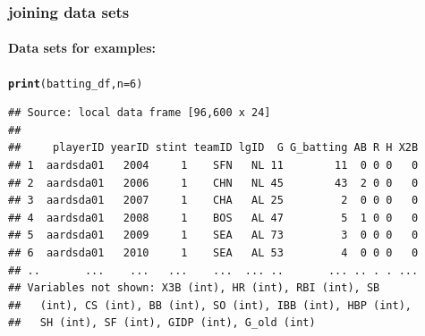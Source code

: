 \documentclass{beamer}\usepackage[]{graphicx}\usepackage[]{color}
\makeatletter
\newcommand{\hlnum}[1]{\textcolor[rgb]{0.686,0.059,0.569}{#1}}%
\newcommand{\hlstr}[1]{\textcolor[rgb]{0.192,0.494,0.8}{#1}}%
\newcommand{\hlcom}[1]{\textcolor[rgb]{0.678,0.584,0.686}{\textit{#1}}}%
\newcommand{\hlopt}[1]{\textcolor[rgb]{0,0,0}{#1}}%
\newcommand{\hlstd}[1]{\textcolor[rgb]{0.345,0.345,0.345}{#1}}%
\newcommand{\hlkwb}[1]{\textcolor[rgb]{0.69,0.353,0.396}{#1}}%
\newcommand{\hlkwc}[1]{\textcolor[rgb]{0.333,0.667,0.333}{#1}}%
\newcommand{\hlkwd}[1]{\textcolor[rgb]{0.737,0.353,0.396}{\textbf{#1}}}%
\newenvironment{kframe}{%
 \def\at@end@of@kframe{}%
 \ifinner\ifhmode%
  \def\at@end@of@kframe{\end{minipage}}%
  \begin{minipage}{\columnwidth}%
 \fi\fi%
 \def\FrameCommand##1{\hskip\@totalleftmargin \hskip-\fboxsep
 \colorbox{shadecolor}{##1}\hskip-\fboxsep
     \hskip-\linewidth \hskip-\@totalleftmargin \hskip\columnwidth}%
 \MakeFramed {\advance\hsize-\width
   \@totalleftmargin\z@ \linewidth\hsize
   \@setminipage}}%
 {\par\unskip\endMakeFramed%
 \at@end@of@kframe}
\newenvironment{knitrout}{}{} %
\makeatother
\begin{document}

\begin{frame}[fragile]
  \frametitle{joining data sets} 
  \framesubtitle{Data sets for examples:}
\begin{knitrout}\footnotesize
{}\color{fgcolor}\begin{kframe}
\begin{alltt}
\hlkwd{print}\hlstd{(batting_df,}  \hlkwc{n} \hlstd{=} \hlnum{6}\hlstd{)}
\end{alltt}
\begin{verbatim}
## Source: local data frame [96,600 x 24]
## 
##     playerID yearID stint teamID lgID  G G_batting AB R H X2B
## 1  aardsda01   2004     1    SFN   NL 11        11  0 0 0   0
## 2  aardsda01   2006     1    CHN   NL 45        43  2 0 0   0
## 3  aardsda01   2007     1    CHA   AL 25         2  0 0 0   0
## 4  aardsda01   2008     1    BOS   AL 47         5  1 0 0   0
## 5  aardsda01   2009     1    SEA   AL 73         3  0 0 0   0
## 6  aardsda01   2010     1    SEA   AL 53         4  0 0 0   0
## ..       ...    ...   ...    ...  ... ..       ... .. . . ...
## Variables not shown: X3B (int), HR (int), RBI (int), SB
##   (int), CS (int), BB (int), SO (int), IBB (int), HBP (int),
##   SH (int), SF (int), GIDP (int), G_old (int)
\end{verbatim}
\end{kframe}
\end{knitrout}
\end{frame} 
\end{document}
